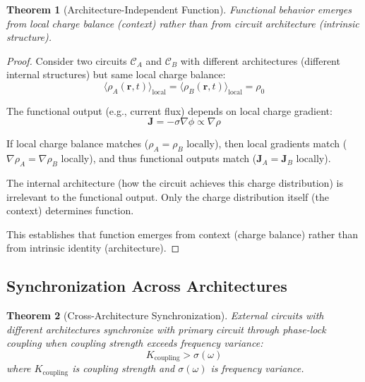\documentclass[12pt,a4paper]{article}
\theoremstyle{plain}
\newtheorem{theorem}{Theorem}[section]
\theoremstyle{definition}
\theoremstyle{remark}
\begin{document}
\begin{theorem}[Architecture-Independent Function]
\label{thm:architecture_independent}
Functional behavior emerges from local charge balance (context) rather than from circuit architecture (intrinsic structure).
\end{theorem}

\begin{proof}
Consider two circuits $\mathcal{C}_A$ and $\mathcal{C}_B$ with different architectures (different internal structures) but same local charge balance:
\begin{equation}
\langle \rho_A(\mathbf{r},t) \rangle_{\text{local}} = \langle \rho_B(\mathbf{r},t) \rangle_{\text{local}} = \rho_0
\end{equation}

The functional output (e.g., current flux) depends on local charge gradient:
\begin{equation}
\mathbf{J} = -\sigma \nabla \phi \propto \nabla \rho
\end{equation}

If local charge balance matches ($\rho_A = \rho_B$ locally), then local gradients match ($\nabla \rho_A = \nabla \rho_B$ locally), and thus functional outputs match ($\mathbf{J}_A = \mathbf{J}_B$ locally).

The internal architecture (how the circuit achieves this charge distribution) is irrelevant to the functional output. Only the charge distribution itself (the context) determines function.

This establishes that function emerges from context (charge balance) rather than from intrinsic identity (architecture).
\end{proof}

\subsection{Synchronization Across Architectures}

\begin{theorem}[Cross-Architecture Synchronization]
\label{thm:cross_sync}
External circuits with different architectures synchronize with primary circuit through phase-lock coupling when coupling strength exceeds frequency variance:
\begin{equation}
K_{\text{coupling}} > \sigma(\omega)
\end{equation}
where $K_{\text{coupling}}$ is coupling strength and $\sigma(\omega)$ is frequency variance.
\end{theorem}
\end{document}
